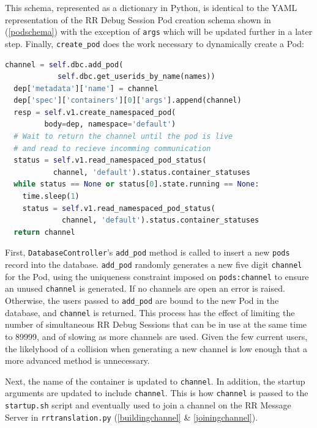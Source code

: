 \documentclass[12pt]{article}
\begin{document}
This schema, represented as a dictionary in Python, is identical to
the YAML representation of the RR Debug Session Pod creation schema
shown in (\ref{podschema}) with the exception of \lstinline{args}
which will be updated further in a later step.  Finally,
\lstinline{create_pod} does the
work necessary to dynamically create a Pod:\\

\begin{lstlisting}[language=Python,basicstyle=\linespread{0.5}\ttfamily\small,caption={Pod Creation 3},captionpos=b]
  channel = self.dbc.add_pod(
            self.dbc.get_userids_by_name(names))
  dep['metadata']['name'] = channel
  dep['spec']['containers'][0]['args'].append(channel)
  resp = self.v1.create_namespaced_pod(
         body=dep, namespace='default')
  # Wait to return the channel until the pod is live
  # and read to recieve incomming communication
  status = self.v1.read_namespaced_pod_status(
           channel, 'default').status.container_statuses
  while status == None or status[0].state.running == None:
    time.sleep(1)
    status = self.v1.read_namespaced_pod_status(
             channel, 'default').status.container_statuses
  return channel
\end{lstlisting}

First, \lstinline{DatabaseController}'s \lstinline{add_pod} method is
called to insert a new \lstinline{pods} record into the database.
\lstinline{add_pod} randomly generates a new five digit
\lstinline{channel} for the Pod, using the uniqueness constraint
imposed on \lstinline{pods:channel} to ensure an unused
\lstinline{channel} is generated.  If no channels are open an error is
raised.  Otherwise, the users passed to \lstinline{add_pod} are bound
to the new Pod in the database, and \lstinline{channel} is returned.
This process has the effect of limiting the number of simultaneous RR
Debug Sessions that can be in use at the same time to 89999, and of
slowing as more channels are used.  Given the few current users, the
likelyhood of a collision when generating a new channel is low enough
that a more advanced method is unnecessary.
\par

Next, the name of the container is updated to \lstinline{channel}.  In
addition, the startup arguments are updated to include
\lstinline{channel}.  This is how \lstinline{channel} is passed to the
\lstinline{startup.sh} script and eventually used to join a channel on
the RR Message Server in \lstinline{rrtranslation.py}
(\ref{buildingchannel} \& \ref{joiningchannel}).
\par
\end{document}
